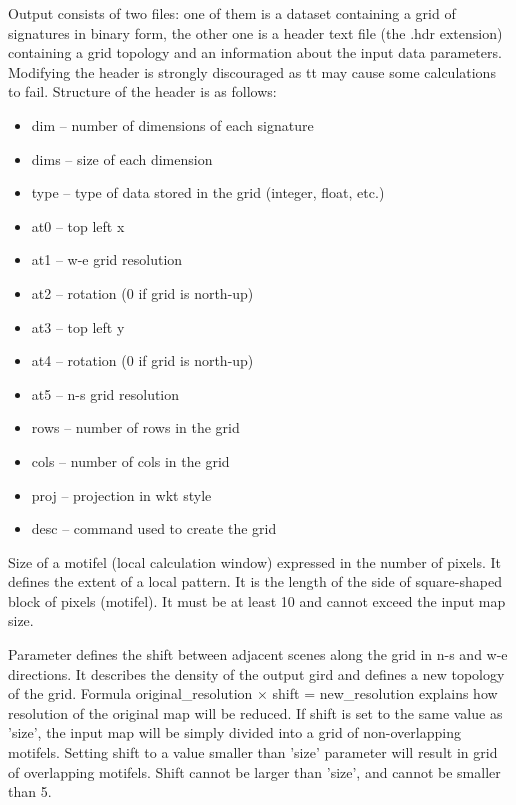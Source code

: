 
Output consists of two files: one of them is a dataset containing a grid of signatures in binary form, the other one is a header text file (the .hdr extension) containing a grid topology and an information about the input data parameters.
Modifying the header is strongly discouraged as tt may cause some calculations to fail. 
Structure of the header is as follows:\\

\begin{itemize}
	\item dim -- number of dimensions of each signature
	\item dims -- size of each dimension
	\item type -- type of data stored in the grid (integer, float, etc.)
	\item at0 -- top left x
	\item at1 -- w-e grid resolution
	\item at2 -- rotation (0 if grid is north-up)
	\item at3 -- top left y
	\item at4 -- rotation (0 if grid is north-up)
	\item at5 -- n-s grid resolution
	\item rows -- number of rows in the grid
	\item cols -- number of cols in the grid
	\item proj -- projection in wkt style
	\item desc -- command used to create the grid
\end{itemize}


Size of a motifel (local calculation window) expressed in the number of pixels. 
It defines the extent of a local pattern.
It is the length of the side of square-shaped block of pixels (motifel).
It must be at least 10 and cannot exceed the input map size.


Parameter defines the shift between adjacent scenes along the grid in n-s and w-e directions. 
It describes the density of the output gird and defines a new topology of the grid.
Formula original\_resolution $\times$ shift = new\_resolution explains how resolution of the original map will be reduced. 
If shift is set to the same value as 'size', the input map will be simply divided into a grid of non-overlapping motifels. 
Setting shift to a value smaller than 'size' parameter will result in grid of overlapping motifels. 
Shift cannot be larger than 'size', and cannot be smaller than 5.

